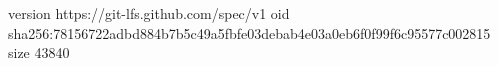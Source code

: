 version https://git-lfs.github.com/spec/v1
oid sha256:78156722adbd884b7b5c49a5fbfe03debab4e03a0eb6f0f99f6c95577c002815
size 43840
